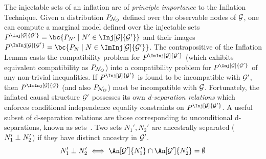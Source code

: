 \documentclass[aps, 10pt, english, twoside, pra, nofootinbib, tightenlines, longbibliography, superscriptaddress]{revtex4-1}
\begin{document}
    The injectable sets of an inflation are of \textit{principle importance} to the Inflation Technique. Given a distribution $\prob[\nodes_{O}]$ defined over the observable nodes of $\mathcal{G}$, one can compute a marginal model defined over the injectable sets $\prob^{\Inj[\graph]{\graph'}} = \bc{\prob[N'] \mid N' \in \Inj[\graph]{\graph'}}$ and their images $\prob^{\ImInj[\graph]{\graph'}} = \bc{\prob[N] \mid N \in \ImInj[\graph]{\graph'}}$. The contrapositive of the Inflation Lemma casts the compatibility problem for $\prob^{\ImInj[\graph]{\graph'}}$ (which exhibits equivalent compatibility as $\prob[\nodes_O]$) into a compatibility problem for $\prob^{\Inj[\graph]{\graph'}}$ of any non-trivial inequalities. If $\prob^{\Inj[\graph]{\graph'}}$ is found to be incompatible with $\mathcal{G}'$, then $\prob^{\ImInj[\graph]{\graph}}$ (and also $\prob[\nodes_O]$) must be incompatible with $\mathcal{G}$. Fortunately, the inflated causal structure $\mathcal{G}'$ possesses its own \textit{d-separation relations} which enforces conditional independence equality constraints on $\prob^{\Inj[\graph]{\graph'}}$. A useful subset of d-separation relations are those corresponding to unconditional d-separations, known as  sets~\cite{Pearl_2009}. Two sets $N_1', N_2'$ are ancestrally separated ($N_1' \perp N_2'$) if they have distinct ancestry in $\mathcal{G}'$.
    \[ N_1' \ancestralindep N_2' \iff \An[\graph']{N_1'} \cap \An[\graph']{N_2'}= \emptyset \]
\end{document}
